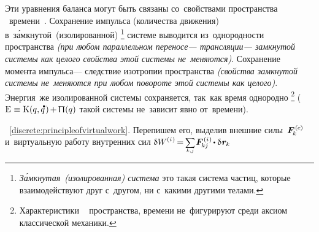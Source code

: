 

Эти уравнения баланса
могут быть связаны
со~свойствами
пространства
~времени~\cite{landau.lifshitz-shortcourse}.
Сохранение импульса
(количества движения)
в~з\'{а}мкнутой~(изолированной)%
\footnote{\emph{З\'{а}мкнутая~(изолированная) система}
это такая система частиц,
которые
взаимодействуют
друг с~другом,
ни с~какими другими телами.}\hspace{-0.25ex}
системе выводится из~однородности пространства \emph{(при любом параллельном переносе\:--- трансляции\:--- замкнутой системы как целого свойства этой системы не~меняются)}.
Сохранение момента импульса\:--- следствие изотропии пространства \emph{(свойства замкнутой системы не~меняются при любом повороте этой системы как целого)}.
Энергия~же
изолированной системы
сохраняется,
так~как
время однородно%
%
\footnote{%
Характеристики
~
пространства,
времени
не~фигурируют среди аксиом
классической механики.
}\hspace{-0.25ex} %
(
${\mathrm{E} \hspace{.1ex} \equiv \kineticenergyinmechanics \hspace{.1ex} (q, \mathdotabove{q} \hspace{.2ex}) \hspace{-0.2ex} + \hspace{-0.1ex} \potentialenergyinmechanics (q)}$
такой системы
не~зависит явно от~времени).

~\eqref{discrete:principleofvirtualwork}.
Перепишем его,
выделив
внешние силы~${\bm{F}^{\smthexternal}_{\hspace{-0.16ex}k}}$
и~виртуальную работу
внутренних сил
${\variation{\internalwork} \hspace{-0.1ex} = \hspace{-0.2ex} \scalebox{.8}{$ \displaystyle \underset{\raisemath{.25ex}{\smash{k,\hspace{.1ex}j}}}{\sum} $} \hspace{.2ex} \bm{F}^{\smthinternal}_{\hspace{-0.16ex}kj} \hspace{-0.1ex} \dotp \variation{\hspace{.1ex}\locationvector_{\hspace{-0.1ex}k}} \hspace{.1ex}}$


